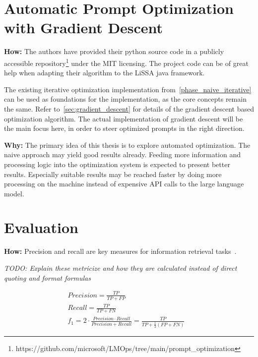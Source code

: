 \section{Automatic Prompt Optimization with Gradient Descent}
\label{approach:sec:gradient_descent}
\textbf{How:} The authors have provided their python source code in a publicly accessible repository\footnote{https://github.com/microsoft/LMOps/tree/main/prompt\_optimization} under the MIT licensing. The project code can be of great help when adapting their algorithm to the LiSSA java framework.

The existing iterative optimization implementation from~\ref{phase_naive_iterative} can be used as foundations for the implementation, as the core concepts remain the same. Refer to~\ref{sec:gradient_descent} for details of the gradient descent based optimization algorithm. The actual implementation of gradient descent will be the main focus here, in order to steer optimized prompts in the right direction.


\textbf{Why:} The primary idea of this thesis is to explore automated optimization. The naive approach may yield good results already. Feeding more information and processing logic into the optimization system is expected to present better results. Especially suitable results may be reached faster by doing more processing on the machine instead of expensive API calls to the large language model.


\section{Evaluation}
\label{approach:sec:evaluation}
\textbf{How:} Precision and recall are key measures for information retrieval tasks~\cite{hayes2006AdvancingCandidate}.

\textit{TODO: Explain these metricize and how they are calculated instead of direct quoting and format formulas} 

\begin{align*} 
    Precision = \frac{TP}{TP + FP} &\\
    Recall = \frac{TP}{TP + FN} &\\
    f_1 = 2 \cdot \frac{Precision \cdot Recall}{Precision + Recall} = \frac{TP}{TP + \frac{1}{2}(FP + FN)} &
\end{align*}



